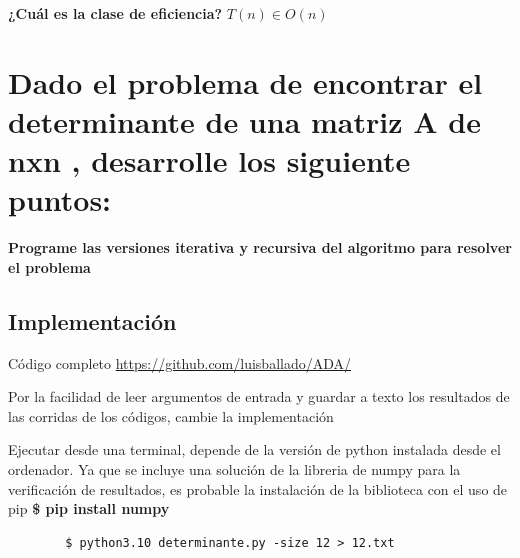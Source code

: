 \documentclass{article}
\begin{document}
\begin{question}
  \textbf{¿Cuál es la clase de eficiencia?}
  \textit{$T(n) \in O(n)$}
    
\end{question}

\newpage
\section{Dado el problema de encontrar el determinante de una matriz A de nxn , desarrolle los siguiente puntos:}

\begin{question}
  \textbf{Programe las versiones iterativa y recursiva del algoritmo para resolver el problema}
\end{question}

\subsection{Implementación}

Código completo \url{https://github.com/luisballado/ADA/}

Por la facilidad de leer argumentos de entrada y guardar a texto los resultados de las corridas de los códigos, cambie la implementación

Ejecutar desde una terminal, depende de la versión de python instalada desde el ordenador. Ya que se incluye una solución de la libreria de numpy para la verificación de resultados, es probable la instalación de la biblioteca con el uso de pip \textbf{\$ pip install numpy}

\begin{commandline}
	\begin{verbatim}
		$ python3.10 determinante.py -size 12 > 12.txt
	\end{verbatim}
\end{commandline}
\end{document}
